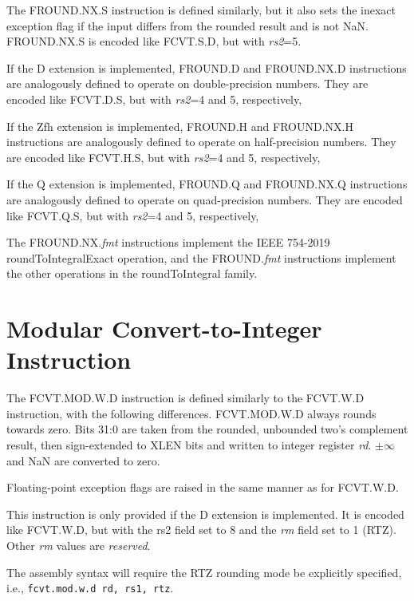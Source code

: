 The FROUND.NX.S instruction is defined similarly, but it also sets the inexact
exception flag if the input differs from the rounded result and is not NaN.
FROUND.NX.S is encoded like FCVT.S.D, but with {\em rs2}=5.

If the D extension is implemented, FROUND.D and FROUND.NX.D instructions are
analogously defined to operate on double-precision numbers.
They are encoded like FCVT.D.S, but with {\em rs2}=4 and 5, respectively,

If the Zfh extension is implemented, FROUND.H and FROUND.NX.H instructions are
analogously defined to operate on half-precision numbers.
They are encoded like FCVT.H.S, but with {\em rs2}=4 and 5, respectively,

If the Q extension is implemented, FROUND.Q and FROUND.NX.Q instructions are
analogously defined to operate on quad-precision numbers.
They are encoded like FCVT.Q.S, but with {\em rs2}=4 and 5, respectively,

\begin{commentary}
The FROUND.NX.{\em fmt} instructions implement the IEEE 754-2019
roundToIntegralExact operation, and the FROUND.{\em fmt} instructions
implement the other operations in the roundToIntegral family.
\end{commentary}


\section{Modular Convert-to-Integer Instruction}

The FCVT.MOD.W.D instruction is defined similarly to the FCVT.W.D
instruction, with the following differences.
FCVT.MOD.W.D always rounds towards zero.
Bits 31:0 are taken from the rounded, unbounded two's complement result,
then sign-extended to XLEN bits and written to integer register {\em rd}.
$\pm\infty$ and NaN are converted to zero.

Floating-point exception flags are raised in the same manner as for FCVT.W.D.

This instruction is only provided if the D extension is implemented.
It is encoded like FCVT.W.D, but with the {\rm rs2} field set to 8
and the {\em rm} field set to 1 (RTZ).
Other {\em rm} values are {\em reserved}.

\begin{commentary}
The assembly syntax will require the RTZ rounding mode be explicitly
specified, i.e., {\tt fcvt.mod.w.d rd, rs1, rtz}.
\end{commentary}

